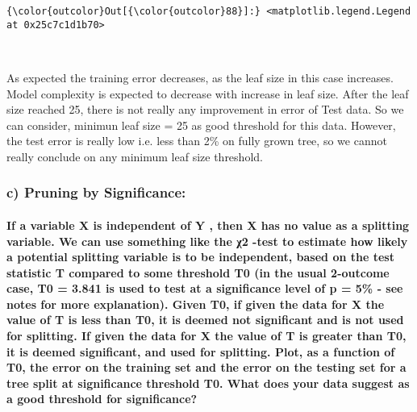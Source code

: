 \documentclass[11pt]{article}
\begin{document}
\begin{Verbatim}[commandchars=\\\{\}]
{\color{outcolor}Out[{\color{outcolor}88}]:} <matplotlib.legend.Legend at 0x25c7c1d1b70>
\end{Verbatim}
            
    \begin{center}
    \end{center}
    { \hspace*{\fill} \\}
    
    As expected the training error decreases, as the leaf size in this case
increases. Model complexity is expected to decrease with increase in
leaf size. After the leaf size reached 25, there is not really any
improvement in error of Test data. So we can consider, minimun leaf size
= 25 as good threshold for this data. However, the test error is really
low i.e. less than 2\% on fully grown tree, so we cannot really conclude
on any minimum leaf size threshold.

    \subsubsection{c) Pruning by
Significance:}\label{c-pruning-by-significance}

\paragraph{If a variable X is independent of Y , then X has no value as
a splitting variable. We can use something like the χ2 -test to estimate
how likely a potential splitting variable is to be independent, based on
the test statistic T compared to some threshold T0 (in the usual
2-outcome case, T0 = 3.841 is used to test at a significance level of p
= 5\% - see notes for more explanation). Given T0, if given the data for
X the value of T is less than T0, it is deemed not significant and is
not used for splitting. If given the data for X the value of T is
greater than T0, it is deemed significant, and used for splitting. Plot,
as a function of T0, the error on the training set and the error on the
testing set for a tree split at significance threshold T0. What does
your data suggest as a good threshold for
significance?}\label{if-a-variable-x-is-independent-of-y-then-x-has-no-value-as-a-splitting-variable.-we-can-use-something-like-the-ux3c72--test-to-estimate-how-likely-a-potential-splitting-variable-is-to-be-independent-based-on-the-test-statistic-t-compared-to-some-threshold-t0-in-the-usual-2-outcome-case-t0-3.841-is-used-to-test-at-a-significance-level-of-p-5---see-notes-for-more-explanation.-given-t0-if-given-the-data-for-x-the-value-of-t-is-less-than-t0-it-is-deemed-not-significant-and-is-not-used-for-splitting.-if-given-the-data-for-x-the-value-of-t-is-greater-than-t0-it-is-deemed-significant-and-used-for-splitting.-plot-as-a-function-of-t0-the-error-on-the-training-set-and-the-error-on-the-testing-set-for-a-tree-split-at-significance-threshold-t0.-what-does-your-data-suggest-as-a-good-threshold-for-significance}
\end{document}
